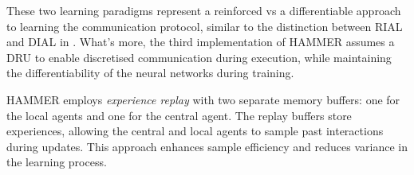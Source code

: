 \documentclass{article}
\begin{document}
These two learning paradigms represent a reinforced vs a differentiable approach to learning the communication protocol, similar to the distinction between RIAL and DIAL in \citet{foerster2016learning}. What's more, the third implementation of HAMMER assumes a DRU to enable discretised communication during execution, while maintaining the differentiability of the neural networks during training.
\

HAMMER employs \textit{experience replay} with two separate memory buffers: one for the local agents and one for the central agent. The replay buffers store experiences, allowing the central and local agents to sample past interactions during updates. This approach enhances sample efficiency and reduces variance in the learning process.
\end{document}
